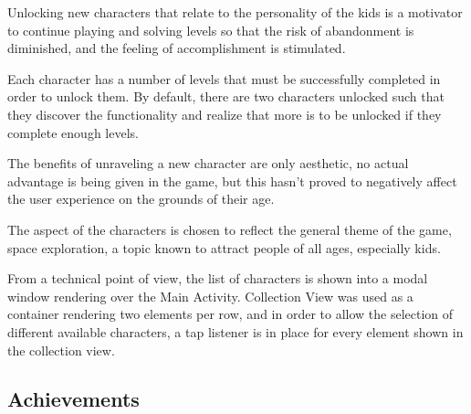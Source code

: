 \documentclass[12 pct]{report}
\begin{document}
Unlocking new characters that relate to the personality of the kids is a motivator to continue playing and solving levels so that the risk of abandonment is diminished, and the feeling of accomplishment is stimulated.

Each character has a number of levels that must be successfully completed in order to unlock them.  By default, there are two characters unlocked such that they discover the functionality and realize that more is to be unlocked if they complete enough levels.

The benefits of unraveling a new character are only aesthetic, no actual advantage is being given in the game, but this hasn't proved to negatively affect the user experience on the grounds of their age.

The aspect of the characters is chosen to reflect the general theme of the game, space exploration, a topic known to attract people of all ages, especially kids.

From a technical point of view, the list of characters is shown into a modal window rendering over the Main Activity. Collection View was used as a container rendering two elements per row, and in order to allow the selection of different available characters, a tap listener is in place for every element shown in the collection view.

\subsection*{Achievements}
 
\end{document}

